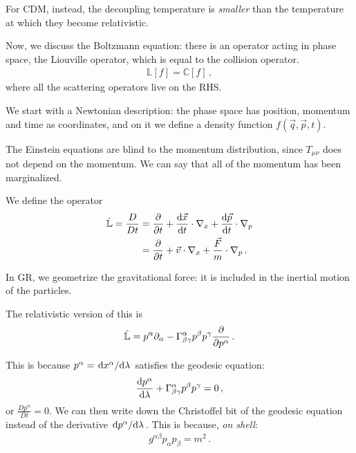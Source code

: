 \documentclass[main.tex]{subfiles}
\begin{document}
For CDM, instead, the decoupling temperature is \emph{smaller} than the temperature at which they become relativistic. 

Now, we discuss the Boltzmann equation: there is an operator acting in phase space, the Liouville operator, which is equal to the collision operator.
%
\begin{align}
  \mathbb{L} [f] = \mathbb{C} [f]
\,,
\end{align}
%
where all the scattering operators live on the RHS. 

We start with a Newtonian description: the phase space has position, momentum and time as coordinates, and on it we define a density function \(f(\vec{q}, \vec{p}, t)\). 

The Einstein equations are blind to the momentum distribution, since \(T_{\mu \nu }\) does not depend on the momentum. We can say that all of the momentum has been marginalized. 

We define the operator 
%
\begin{subequations}
\begin{align}
  \hat{\mathbb{L}} = \frac{D}{Dt} &= \pdv{}{t} + \dv{\vec{x}}{t} \cdot \nabla_x + \dv{\vec{p}}{t} \cdot \nabla_p   \\
  &= \pdv{}{t} + \vec{v} \cdot \nabla_x + \frac{\vec{F}}{m} \cdot \nabla_p 
\,. 
\end{align}
\end{subequations}

In GR, we geometrize the gravitational force: it is included in the inertial motion of the particles. 

The relativistic version of this is 
%
\begin{align}
  \hat{\mathbb{L}} = p^{\alpha } \partial_{\alpha } - \Gamma^{\alpha }_{\beta \gamma } p^{\beta } p^{\gamma } \pdv{}{p^{\alpha }}
\,.
\end{align}
%

This is because \(p^{\alpha } = \dv*{x^{\alpha }}{\lambda }\) satisfies the geodesic equation: 
%
\begin{align}
  \dv{p^{\alpha }}{\lambda } + \Gamma^{\alpha }_{\beta \gamma } p^{\beta } p^{\gamma }=0
\,,
\end{align}
%
or \(\frac{Dp^{\alpha }}{Dt } =0\). We can then write down the Christoffel bit of the geodesic equation instead of the derivative \(\dv*{p^{\alpha }}{\lambda }\). This is because, \emph{on shell}: 
%
\begin{align}
  g^{\alpha \beta } p_{\alpha } p_{\beta } = m^2
\,. 
\end{align}
\end{document}
